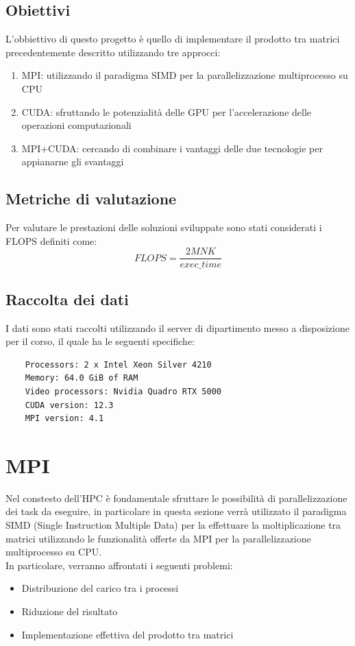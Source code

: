 \documentclass[conference]{IEEEtran}
\begin{document}
\subsection{Obiettivi}
L'obbiettivo di questo progetto è quello di implementare il prodotto tra matrici precedentemente descritto utilizzando tre approcci:
\begin{enumerate}
    \item MPI: utilizzando il paradigma SIMD per la parallelizzazione multiprocesso su CPU
    \item CUDA: sfruttando le potenzialità delle GPU per l'accelerazione delle operazioni computazionali
    \item MPI+CUDA: cercando di combinare i vantaggi delle due tecnologie per appianarne gli svantaggi
\end{enumerate}
\subsection{Metriche di valutazione}
Per valutare le prestazioni delle soluzioni sviluppate sono stati considerati i FLOPS definiti come:
\begin{equation}
    FLOPS = \frac{2MNK}{exec\_time}
\end{equation}
\subsection{Raccolta dei dati}
I dati sono stati raccolti utilizzando il server di dipartimento messo a disposizione per il corso, il quale ha le seguenti specifiche:
\begin{verbatim}
    Processors: 2 x Intel Xeon Silver 4210
    Memory: 64.0 GiB of RAM
    Video processors: Nvidia Quadro RTX 5000
    CUDA version: 12.3
    MPI version: 4.1
\end{verbatim}
\section{MPI}
Nel constesto dell'HPC è fondamentale sfruttare le possibilità di parallelizzazione dei task da eseguire, in particolare in questa sezione verrà utilizzato il paradigma SIMD (Single Instruction Multiple Data) per la effettuare la moltiplicazione tra matrici utilizzando le funzionalità offerte da MPI per la parallelizzazione multiprocesso su CPU.\\ In particolare, verranno affrontati i seguenti problemi:
\begin{itemize}
    \item Distribuzione del carico tra i processi
    \item Riduzione del risultato
    \item Implementazione effettiva del prodotto tra matrici
\end{itemize}
\end{document}
